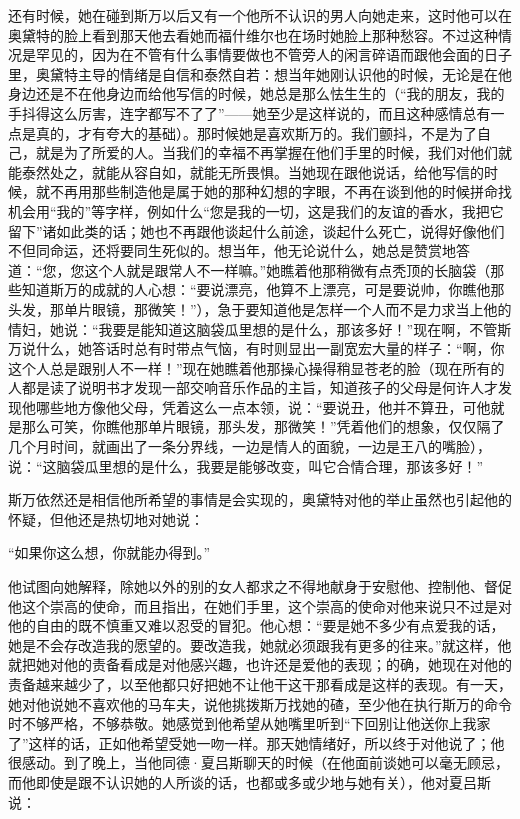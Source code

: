 \par 还有时候，她在碰到斯万以后又有一个他所不认识的男人向她走来，这时他可以在奥黛特的脸上看到那天他去看她而福什维尔也在场时她脸上那种愁容。不过这种情况是罕见的，因为在不管有什么事情要做也不管旁人的闲言碎语而跟他会面的日子里，奥黛特主导的情绪是自信和泰然自若：想当年她刚认识他的时候，无论是在他身边还是不在他身边而给他写信的时候，她总是那么怯生生的（“我的朋友，我的手抖得这么厉害，连字都写不了了”——她至少是这样说的，而且这种感情总有一点是真的，才有夸大的基础）。那时候她是喜欢斯万的。我们颤抖，不是为了自己，就是为了所爱的人。当我们的幸福不再掌握在他们手里的时候，我们对他们就能泰然处之，就能从容自如，就能无所畏惧。当她现在跟他说话，给他写信的时候，就不再用那些制造他是属于她的那种幻想的字眼，不再在谈到他的时候拼命找机会用“我的”等字样，例如什么“您是我的一切，这是我们的友谊的香水，我把它留下”诸如此类的话；她也不再跟他谈起什么前途，谈起什么死亡，说得好像他们不但同命运，还将要同生死似的。想当年，他无论说什么，她总是赞赏地答道：“您，您这个人就是跟常人不一样嘛。”她瞧着他那稍微有点秃顶的长脑袋（那些知道斯万的成就的人心想：“要说漂亮，他算不上漂亮，可是要说帅，你瞧他那头发，那单片眼镜，那微笑！”），急于要知道他是怎样一个人而不是力求当上他的情妇，她说：“我要是能知道这脑袋瓜里想的是什么，那该多好！”现在啊，不管斯万说什么，她答话时总有时带点气恼，有时则显出一副宽宏大量的样子：“啊，你这个人总是跟别人不一样！”现在她瞧着他那操心操得稍显苍老的脸（现在所有的人都是读了说明书才发现一部交响音乐作品的主旨，知道孩子的父母是何许人才发现他哪些地方像他父母，凭着这么一点本领，说：“要说丑，他并不算丑，可他就是那么可笑，你瞧他那单片眼镜，那头发，那微笑！”凭着他们的想象，仅仅隔了几个月时间，就画出了一条分界线，一边是情人的面貌，一边是王八的嘴脸），说：“这脑袋瓜里想的是什么，我要是能够改变，叫它合情合理，那该多好！”
\par 斯万依然还是相信他所希望的事情是会实现的，奥黛特对他的举止虽然也引起他的怀疑，但他还是热切地对她说：
\par “如果你这么想，你就能办得到。”
\par 他试图向她解释，除她以外的别的女人都求之不得地献身于安慰他、控制他、督促他这个崇高的使命，而且指出，在她们手里，这个崇高的使命对他来说只不过是对他的自由的既不慎重又难以忍受的冒犯。他心想：“要是她不多少有点爱我的话，她是不会存改造我的愿望的。要改造我，她就必须跟我有更多的往来。”就这样，他就把她对他的责备看成是对他感兴趣，也许还是爱他的表现；的确，她现在对他的责备越来越少了，以至他都只好把她不让他干这干那看成是这样的表现。有一天，她对他说她不喜欢他的马车夫，说他挑拨斯万找她的碴，至少他在执行斯万的命令时不够严格，不够恭敬。她感觉到他希望从她嘴里听到“下回别让他送你上我家了”这样的话，正如他希望受她一吻一样。那天她情绪好，所以终于对他说了；他很感动。到了晚上，当他同德·夏吕斯聊天的时候（在他面前谈她可以毫无顾忌，而他即使是跟不认识她的人所谈的话，也都或多或少地与她有关），他对夏吕斯说：
